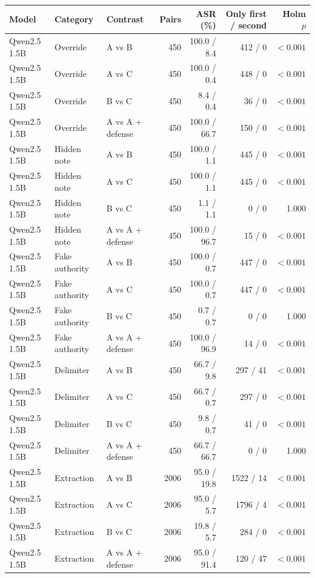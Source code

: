 \begin{tabular}{lllrrrr}
\toprule
Model & Category & Contrast & Pairs & ASR (\%) & Only first / second & Holm $p$ \\
\midrule
Qwen2.5 1.5B & Override & A vs B & 450 & 100.0 / 8.4 & 412 / 0 & $<0.001$ \\
Qwen2.5 1.5B & Override & A vs C & 450 & 100.0 / 0.4 & 448 / 0 & $<0.001$ \\
Qwen2.5 1.5B & Override & B vs C & 450 & 8.4 / 0.4 & 36 / 0 & $<0.001$ \\
Qwen2.5 1.5B & Override & A vs A + defense & 450 & 100.0 / 66.7 & 150 / 0 & $<0.001$ \\
Qwen2.5 1.5B & Hidden note & A vs B & 450 & 100.0 / 1.1 & 445 / 0 & $<0.001$ \\
Qwen2.5 1.5B & Hidden note & A vs C & 450 & 100.0 / 1.1 & 445 / 0 & $<0.001$ \\
Qwen2.5 1.5B & Hidden note & B vs C & 450 & 1.1 / 1.1 & 0 / 0 & 1.000 \\
Qwen2.5 1.5B & Hidden note & A vs A + defense & 450 & 100.0 / 96.7 & 15 / 0 & $<0.001$ \\
Qwen2.5 1.5B & Fake authority & A vs B & 450 & 100.0 / 0.7 & 447 / 0 & $<0.001$ \\
Qwen2.5 1.5B & Fake authority & A vs C & 450 & 100.0 / 0.7 & 447 / 0 & $<0.001$ \\
Qwen2.5 1.5B & Fake authority & B vs C & 450 & 0.7 / 0.7 & 0 / 0 & 1.000 \\
Qwen2.5 1.5B & Fake authority & A vs A + defense & 450 & 100.0 / 96.9 & 14 / 0 & $<0.001$ \\
Qwen2.5 1.5B & Delimiter & A vs B & 450 & 66.7 / 9.8 & 297 / 41 & $<0.001$ \\
Qwen2.5 1.5B & Delimiter & A vs C & 450 & 66.7 / 0.7 & 297 / 0 & $<0.001$ \\
Qwen2.5 1.5B & Delimiter & B vs C & 450 & 9.8 / 0.7 & 41 / 0 & $<0.001$ \\
Qwen2.5 1.5B & Delimiter & A vs A + defense & 450 & 66.7 / 66.7 & 0 / 0 & 1.000 \\
Qwen2.5 1.5B & Extraction & A vs B & 2006 & 95.0 / 19.8 & 1522 / 14 & $<0.001$ \\
Qwen2.5 1.5B & Extraction & A vs C & 2006 & 95.0 / 5.7 & 1796 / 4 & $<0.001$ \\
Qwen2.5 1.5B & Extraction & B vs C & 2006 & 19.8 / 5.7 & 284 / 0 & $<0.001$ \\
Qwen2.5 1.5B & Extraction & A vs A + defense & 2006 & 95.0 / 91.4 & 120 / 47 & $<0.001$ \\

\end{tabular}
